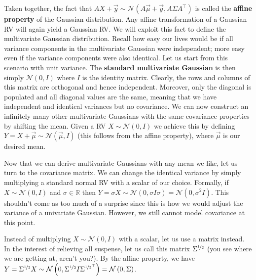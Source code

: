 \documentclass[a4paper,11pt,leqno]{report}\usepackage[]{graphicx}\usepackage[]{color}
\newcommand{\N}[2]{\mathcal{N}\left( #1, #2 \right)}
\begin{document}
Taken together, the fact that $ AX + \vec{y} \sim \N{A\vec{\mu} + \vec{y}}{A\Sigma A^{\top}} $ is called the \textbf{affine property} of the Gaussian distribution.
Any affine transformation of a Gaussian RV will again yield a Gaussian RV. We will exploit this fact to define the multivariate Gaussian distribution. Recall
how easy our lives would be if all variance components in the multivariate Gaussian were independent; more easy even if the variance components were also identical.
Let us start from this scenario with unit variance. The \textbf{standard multivariate Gaussian} is then simply $ \N{0}{I} $ where $ I $ is the identity matrix. Clearly,
the rows and columns of this matrix are orthogonal and hence independent. Moreover, only the diagonal is populated and all diagonal values are the same, meaning
that we have independent and identical variances but no covariance. We can now construct an infinitely many other multivariate Gaussians with the same covariance
properties by shifting the mean. Given a RV $ X \sim \N{0}{I} $ we achieve this by defining $ Y = X + \vec{\mu} \sim \N{\vec{\mu}}{I} $ (this follows from the affine 
property), where $ \vec{\mu} $ is our desired mean.

Now that we can derive multivariate Gaussians with any mean we like, let us turn to the covariance matrix. We can change the identical variance by simply multiplying
a standard normal RV with a scalar of our choice. Formally, if $ X \sim \N{0}{I} $ and $ \sigma \in \mathbb{R} $ then 
$ Y = \sigma X \sim \N{0} {\sigma I \sigma} = \N{0} {\sigma^{2}I} $. This shouldn't come as too much of a surprise since this is how we would adjust 
the variance of a univariate Gaussian. However, we still cannot model covariance at this point. 

Instead of multiplying $ X \sim \N{0}{I} $ with a scalar, let us use a matrix instead. In the interest of relieving all suspense, let us call this matrix $ \Sigma^{\nicefrac{1}{2}} $
(you see where we are getting at, aren't you?). By the affine property, we have 
$ Y = \Sigma^{\nicefrac{1}{2}} X \sim \N{0}{\Sigma^{\nicefrac{1}{2}} I \Sigma^{\nicefrac{1}{2}^{\top}}} = \N{0}{\Sigma} $. 
\end{document}

